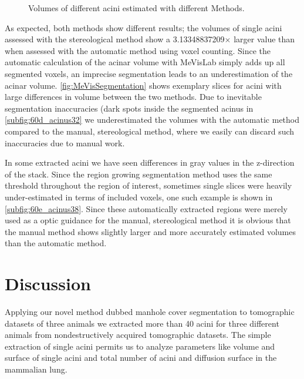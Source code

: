 \documentclass[twoside,paper=a4,abstract=true,english,DIV=calc]{scrartcl}
\newcommand{\difference}{3.13348837209} %
\begin{document}
\begin{figure}[htb]
	\caption{Volumes of different acini estimated with different Methods.}
	\label{fig:VolumeMeVisVsSTEPanizer}%
\end{figure}

As expected, both methods show different results; the volumes of single acini assessed with the stereological method show a \difference\(\times\) larger value than when assessed with the automatic method using voxel counting. Since the automatic calculation of the acinar volume with MeVisLab simply adds up all segmented voxels, an imprecise segmentation leads to an underestimation of the acinar volume. \autoref{fig:MeVisSegmentation} shows exemplary slices for acini with large differences in volume between the two methods. Due to inevitable segmentation inaccuracies (dark spots inside the segmented acinus in \autoref{subfig:60d_acinus32} we underestimated the volumes with the automatic method compared to the manual, stereological method, where we easily can discard such inaccuracies due to manual work.

In some extracted acini we have seen differences in gray values in the z-direction of the stack. Since the region growing segmentation method uses the same threshold throughout the region of interest, sometimes single slices were heavily under-estimated in terms of included voxels, one such example is shown in \autoref{subfig:60e_acinus38}. Since these automatically extracted regions were merely used as a optic guidance for the manual, stereological method it is obvious that the manual method shows slightly larger and more accurately estimated volumes than the automatic method.

\section{Discussion}
Applying our novel method dubbed manhole cover segmentation to tomographic datasets of three animals we extracted more than 40 acini for three different animals from nondestructively acquired tomographic datasets. The simple extraction of single acini permits us to analyze parameters like volume and surface of single acini and total number of acini and diffusion surface in the mammalian lung.
\end{document}
